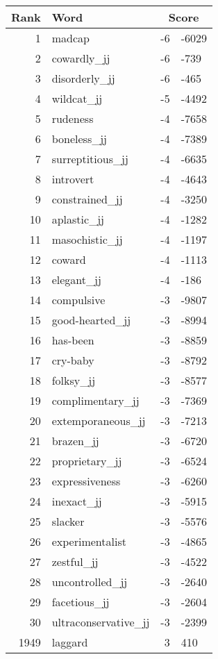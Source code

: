 \begin{longtable}[!htbp]{| rlr@{.}l |}
    \hline
    \textbf{Rank} & \textbf{Word} & \multicolumn{2}{c|}{\textbf{Score}} \\
    \hline
    \endhead
    1 & madcap & -6 & -6029 \\
    2 & cowardly\_jj & -6 & -739 \\
    3 & disorderly\_jj & -6 & -465 \\
    4 & wildcat\_jj & -5 & -4492 \\
    5 & rudeness & -4 & -7658 \\
    6 & boneless\_jj & -4 & -7389 \\
    7 & surreptitious\_jj & -4 & -6635 \\
    8 & introvert & -4 & -4643 \\
    9 & constrained\_jj & -4 & -3250 \\
    10 & aplastic\_jj & -4 & -1282 \\
    11 & masochistic\_jj & -4 & -1197 \\
    12 & coward & -4 & -1113 \\
    13 & elegant\_jj & -4 & -186 \\
    14 & compulsive & -3 & -9807 \\
    15 & good-hearted\_jj & -3 & -8994 \\
    16 & has-been & -3 & -8859 \\
    17 & cry-baby & -3 & -8792 \\
    18 & folksy\_jj & -3 & -8577 \\
    19 & complimentary\_jj & -3 & -7369 \\
    20 & extemporaneous\_jj & -3 & -7213 \\
    21 & brazen\_jj & -3 & -6720 \\
    22 & proprietary\_jj & -3 & -6524 \\
    23 & expressiveness & -3 & -6260 \\
    24 & inexact\_jj & -3 & -5915 \\
    25 & slacker & -3 & -5576 \\
    26 & experimentalist & -3 & -4865 \\
    27 & zestful\_jj & -3 & -4522 \\
    28 & uncontrolled\_jj & -3 & -2640 \\
    29 & facetious\_jj & -3 & -2604 \\
    30 & ultraconservative\_jj & -3 & -2399 \\
    1949 & laggard & 3 & 410 \\

\end{longtable}
